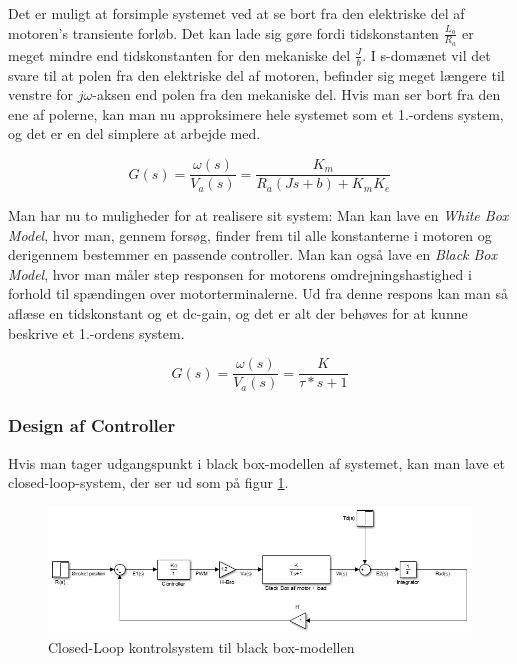 Det er muligt at forsimple systemet ved at se bort fra den elektriske del af motoren's transiente forløb. Det kan lade sig gøre fordi tidskonstanten $\frac{L_{a}}{R_{a}}$ er meget mindre end tidskonstanten for den mekaniske del $\frac{J}{b}$. I s-domænet vil det svare til at polen fra den elektriske del af motoren, befinder sig meget længere til venstre for $j\omega$-aksen end polen fra den mekaniske del. Hvis man ser bort fra den ene af polerne, kan man nu approksimere hele systemet som et 1.-ordens system, og det er en del simplere at arbejde med.

\begin{equation}
G(s)=\dfrac{\omega(s)}{V_{a}(s)}=\dfrac{K_{m}}{R_{a}(Js+b)+K_{m}K_{e}}
\end{equation}

Man har nu to muligheder for at realisere sit system: Man kan lave en \textit{White Box Model}, hvor man, gennem forsøg, finder frem til alle konstanterne i motoren og derigennem bestemmer en passende controller. Man kan også lave en \textit{Black Box Model}, hvor man måler step responsen for motorens omdrejningshastighed i forhold til spændingen over motorterminalerne. Ud fra denne respons kan man så aflæse en tidskonstant og et dc-gain, og det er alt der behøves for at kunne beskrive et 1.-ordens system.

\begin{equation}
G(s)=\dfrac{\omega(s)}{V_{a}(s)}=\dfrac{K}{\tau*s+1}
\end{equation}

\subsubsection{Design af Controller}

Hvis man tager udgangspunkt i black box-modellen af systemet, kan man lave et closed-loop-system, der ser ud som på figur \ref{fig:BB_Model}. 

\begin{figure}[h]
	\begin{center}
		\includegraphics[scale=0.7]{Billeder/BB_Model.PNG}
	\end{center}
\caption{Closed-Loop kontrolsystem til black box-modellen}
\label{fig:BB_Model}
\end{figure}

